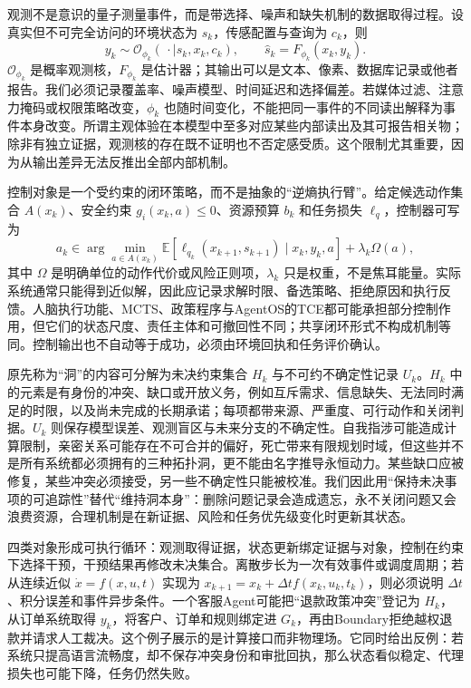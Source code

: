 观测不是意识的量子测量事件，而是带选择、噪声和缺失机制的数据取得过程。设真实但不可完全访问的环境状态为 $s_k$，传感配置与查询为 $c_k$，则
\[
 y_k\sim\mathcal{O}_{\phi_k}(\,\cdot\mid s_k,x_k,c_k),
 \qquad \hat s_k=F_{\phi_k}(x_k,y_k).
\]
$\mathcal{O}_{\phi_k}$ 是概率观测核，$F_{\phi_k}$ 是估计器；其输出可以是文本、像素、数据库记录或他者报告。我们必须记录覆盖率、噪声模型、时间延迟和选择偏差。若媒体过滤、注意力掩码或权限策略改变，$\phi_k$ 也随时间变化，不能把同一事件的不同读出解释为事件本身改变。所谓主观体验在本模型中至多对应某些内部读出及其可报告相关物；除非有独立证据，观测核的存在既不证明也不否定感受质。这个限制尤其重要，因为从输出差异无法反推出全部内部机制。

控制对象是一个受约束的闭环策略，而不是抽象的“逆熵执行臂”。给定候选动作集合 $A(x_k)$、安全约束 $g_i(x_k,a)\le0$、资源预算 $b_k$ 和任务损失 $\ell_q$，控制器可写为
\[
 a_k\in\arg\min_{a\in A(x_k)}
 \mathbb{E}\!\left[\ell_{q_k}(x_{k+1},s_{k+1})\mid x_k,y_k,a\right]
 +\lambda_k\Omega(a),
\]
其中 $\Omega$ 是明确单位的动作代价或风险正则项，$\lambda_k$ 只是权重，不是焦耳能量。实际系统通常只能得到近似解，因此应记录求解时限、备选策略、拒绝原因和执行反馈。人脑执行功能、MCTS、政策程序与AgentOS的TCE都可能承担部分控制作用，但它们的状态尺度、责任主体和可撤回性不同；共享闭环形式不构成机制等同。控制输出也不自动等于成功，必须由环境回执和任务评价确认。

原先称为“洞”的内容可分解为未决约束集合 $H_k$ 与不可约不确定性记录 $U_k$。$H_k$ 中的元素是有身份的冲突、缺口或开放义务，例如互斥需求、信息缺失、无法同时满足的时限，以及尚未完成的长期承诺；每项都带来源、严重度、可行动作和关闭判据。$U_k$ 则保存模型误差、观测盲区与未来分支的不确定性。自我指涉可能造成计算限制，亲密关系可能存在不可合并的偏好，死亡带来有限规划时域，但这些并不是所有系统都必须拥有的三种拓扑洞，更不能由名字推导永恒动力。某些缺口应被修复，某些冲突必须接受，另一些不确定性只能被校准。我们因此用“保持未决事项的可追踪性”替代“维持洞本身”：删除问题记录会造成遗忘，永不关闭问题又会浪费资源，合理机制是在新证据、风险和任务优先级变化时更新其状态。

四类对象形成可执行循环：观测取得证据，状态更新绑定证据与对象，控制在约束下选择干预，干预结果再修改未决集合。离散步长为一次有效事件或调度周期；若从连续近似 $\dot x=f(x,u,t)$ 实现为 $x_{k+1}=x_k+\Delta t f(x_k,u_k,t_k)$，则必须说明 $\Delta t$、积分误差和事件异步条件。一个客服Agent可能把“退款政策冲突”登记为 $H_k$，从订单系统取得 $y_k$，将客户、订单和规则绑定进 $G_k$，再由Boundary拒绝越权退款并请求人工裁决。这个例子展示的是计算接口而非物理场。它同时给出反例：若系统只提高语言流畅度，却不保存冲突身份和审批回执，那么状态看似稳定、代理损失也可能下降，任务仍然失败。

